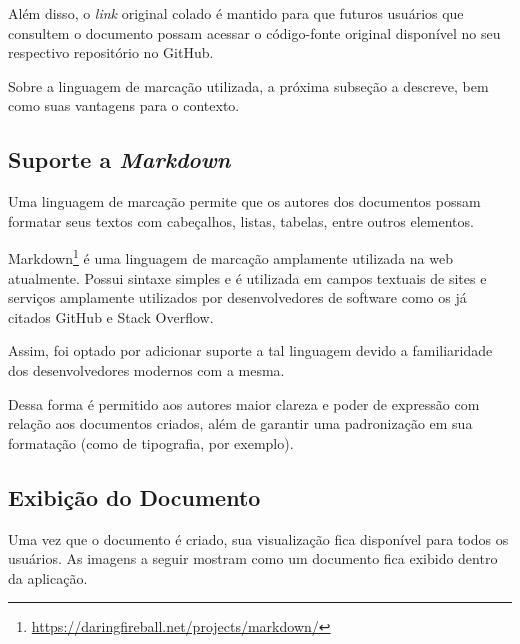 Além disso, o \textit{link} original colado é mantido para que futuros usuários que consultem o documento possam acessar o código-fonte original disponível no seu respectivo repositório no GitHub.

Sobre a linguagem de marcação utilizada, a próxima subseção a descreve, bem como suas vantagens para o contexto.

\subsection{Suporte a \textit{Markdown}}

Uma linguagem de marcação permite que os autores dos documentos possam formatar seus textos com cabeçalhos, listas, tabelas, entre outros elementos.

Markdown\footnote{\url{https://daringfireball.net/projects/markdown/}} é uma linguagem de marcação amplamente utilizada na web atualmente. Possui sintaxe simples e é utilizada em campos textuais de sites e serviços amplamente utilizados por desenvolvedores de software como os já citados GitHub e Stack Overflow.

Assim, foi optado por adicionar suporte a tal linguagem devido a familiaridade dos desenvolvedores modernos com a mesma.

Dessa forma é permitido aos autores maior clareza e poder de expressão com relação aos documentos criados, além de garantir uma padronização em sua formatação (como de tipografia, por exemplo).

\subsection{Exibição do Documento}

Uma vez que o documento é criado, sua visualização fica disponível para todos os usuários. As imagens a seguir mostram como um documento fica exibido dentro da aplicação.

